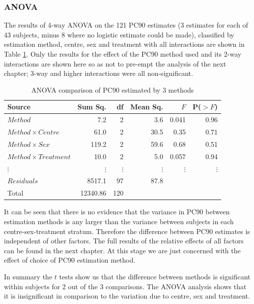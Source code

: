 \subsubsection*{ANOVA}
The results of 4-way ANOVA on the 121 PC90 estimates (3 estimates for each of 43 subjects, minus 8 where no logistic estimate could be made), classified by estimation method, centre, sex and treatment with all interactions are shown in Table \ref{pc90aov}. Only the results for the effect of the PC90 method used and its 2-way interactions are shown here so as not to pre-empt the analysis of the next chapter; 3-way and higher interactions were all non-significant.
\begin{table}[h]
\centering
\caption{ANOVA comparison of PC90 estimated by 3 methods}\label{pc90aov}
\begin{tabular}{l|rrrrr}
Source&Sum Sq.&df&Mean Sq.&$F$&P($>F$)\\
\hline
$Method$&7.2&2&3.6&0.041&$0.96$\\
$Method\times Centre$&61.0&2&30.5&0.35&$0.71$\\
$Method\times Sex$&119.2&2&59.6&0.68&0.51\\
$Method\times Treatment$&10.0&2&5.0&0.057&0.94\\
$\vdots$&$\vdots$&$\vdots$&$\vdots$&$\vdots$&$\vdots$\\
$Residuals$&8517.1&97&87.8&&\\
\hline
Total&12340.86&120&&&
\end{tabular}
\end{table}

It can be seen that there is no evidence that the variance in PC90 between estimation methods is any larger than the variance between subjects in each centre-sex-treatment stratum. Therefore the difference between PC90 estimates is independent of other factors. The full results of the relative effects of all factors can be found in the next chapter. At this stage we are just concerned with the effect of choice of PC90 estimation method.

In summary the $t$ tests show us that the difference between methods is significant within subjects for 2 out of the 3 comparisons. The ANOVA analysis shows that it is insignificant in comparison to the variation due to centre, sex and treatment.

